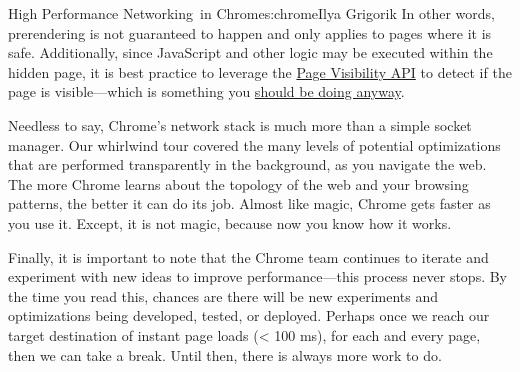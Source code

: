 \begin{aosachapter}{High Performance Networking~in Chrome}{s:chrome}{Ilya Grigorik}
In other words, prerendering is not guaranteed to happen and only
applies to pages where it is safe. Additionally, since JavaScript and
other logic may be executed within the hidden page, it is best practice
to leverage the
\href{https://developers.google.com/chrome/whitepapers/pagevisibility}{Page
Visibility API} to detect if the page is visible---which is something
you
\href{http://www.html5rocks.com/en/tutorials/pagevisibility/intro/}{should
be doing anyway}.


Needless to say, Chrome's network stack is much more than a simple
socket manager. Our whirlwind tour covered the many levels of potential
optimizations that are performed transparently in the background, as you
navigate the web. The more Chrome learns about the topology of the web
and your browsing patterns, the better it can do its job. Almost like
magic, Chrome gets faster as you use it. Except, it is not magic,
because now you know how it works.

Finally, it is important to note that the Chrome team continues to
iterate and experiment with new ideas to improve performance---this
process never stops. By the time you read this, chances are there will
be new experiments and optimizations being developed, tested, or
deployed. Perhaps once we reach our target destination of instant page
loads (\textless{} 100 ms), for each and every page, then we can take a
break. Until then, there is always more work to do.

\end{aosachapter}
